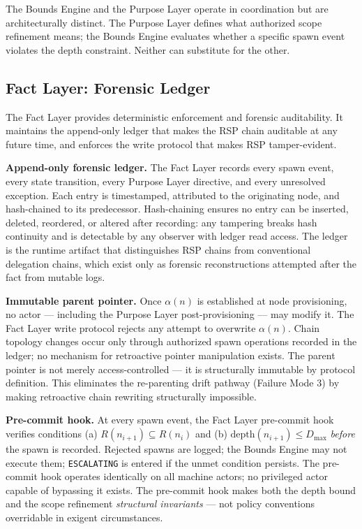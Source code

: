 The Bounds Engine and the Purpose Layer operate in coordination but are architecturally distinct. The Purpose Layer defines what authorized scope refinement means; the Bounds Engine evaluates whether a specific spawn event violates the depth constraint. Neither can substitute for the other.

\subsection{Fact Layer: Forensic Ledger}
\label{sec:rs-fact-ledger}

The Fact Layer provides deterministic enforcement and forensic auditability. It maintains the append-only ledger that makes the RSP chain auditable at any future time, and enforces the write protocol that makes RSP tamper-evident.

\medskip
\noindent\textbf{Append-only forensic ledger.} The Fact Layer records every spawn event, every state transition, every Purpose Layer directive, and every unresolved exception. Each entry is timestamped, attributed to the originating node, and hash-chained to its predecessor. Hash-chaining ensures no entry can be inserted, deleted, reordered, or altered after recording: any tampering breaks hash continuity and is detectable by any observer with ledger read access. The ledger is the runtime artifact that distinguishes RSP chains from conventional delegation chains, which exist only as forensic reconstructions attempted after the fact from mutable logs.

\medskip
\noindent\textbf{Immutable parent pointer.} Once $\alpha(n)$ is established at node provisioning, no actor — including the Purpose Layer post-provisioning — may modify it. The Fact Layer write protocol rejects any attempt to overwrite $\alpha(n)$. Chain topology changes occur only through authorized spawn operations recorded in the ledger; no mechanism for retroactive pointer manipulation exists. The parent pointer is not merely access-controlled — it is structurally immutable by protocol definition. This eliminates the re-parenting drift pathway (Failure Mode 3) by making retroactive chain rewriting structurally impossible.

\medskip
\noindent\textbf{Pre-commit hook.} At every spawn event, the Fact Layer pre-commit hook verifies conditions (a) $R(n_{i+1}) \subseteq R(n_i)$ and (b) $\mathrm{depth}(n_{i+1}) \leq D_{\mathrm{max}}$ \emph{before} the spawn is recorded. Rejected spawns are logged; the Bounds Engine may not execute them; \texttt{ESCALATING} is entered if the unmet condition persists. The pre-commit hook operates identically on all machine actors; no privileged actor capable of bypassing it exists. The pre-commit hook makes both the depth bound and the scope refinement \emph{structural invariants} — not policy conventions overridable in exigent circumstances.

